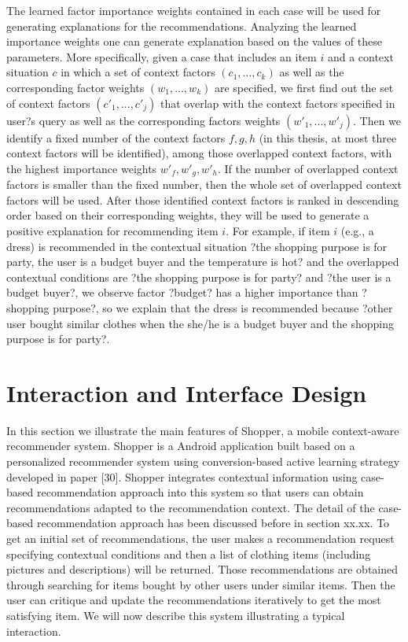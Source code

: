 The learned factor importance weights contained in each case will be used for generating explanations for the recommendations.  Analyzing the learned importance weights one can generate explanation based on the values of these parameters. More specifically, given a case that includes an item $i$ and a context situation $c$ in which a set of context factors $(c_1, ..., c_k)$ as well as the corresponding factor weights $(w_1, ..., w_k)$ are specified, we first find out the set of context factors $(c\prime_1, ..., c\prime_j)$ that overlap with the context factors specified in user?s query as well as the corresponding factors weights $(w\prime_1, ..., w\prime_j)$. Then we identify a fixed number of the context factors $f, g, h$ (in this thesis, at most three context factors will be identified), among those overlapped context factors, with the highest importance weights $w\prime_f, w\prime_g, w\prime_h$. If the number of overlapped context factors is smaller than the fixed number, then the whole set of overlapped context factors will be used. After those identified context factors is ranked in descending order based on their corresponding weights, they will be used to generate a positive explanation for recommending item $i$. For example, if item $i$ (e.g., a dress) is recommended in the contextual situation ?the shopping purpose is for party, the user is a budget buyer and the temperature is hot? and the overlapped contextual conditions are ?the shopping purpose is for party? and ?the user is a budget buyer?, we observe factor ?budget? has a higher importance than ?shopping purpose?, so we explain that the dress is recommended because ?other user bought similar clothes when the she/he is a budget buyer and the shopping purpose is for party?.

\section{Interaction and Interface Design} \label{sec:eg}

In this section we illustrate the main features of Shopper, a mobile context-aware recommender system. Shopper is a Android application built based on a personalized recommender system using conversion-based active learning strategy developed in paper [30]. Shopper integrates contextual information using case-based recommendation approach into this system so that users can obtain recommendations adapted to the recommendation context. The detail of the case-based recommendation approach has been discussed before in section xx.xx. To get an initial set of recommendations, the user makes a recommendation request specifying contextual conditions and then a list of clothing items (including pictures and descriptions) will be returned. Those recommendations are obtained through searching for items bought by other users under similar items. Then the user can critique and update the recommendations iteratively to get the most satisfying item. We will now describe this system illustrating a typical interaction.

